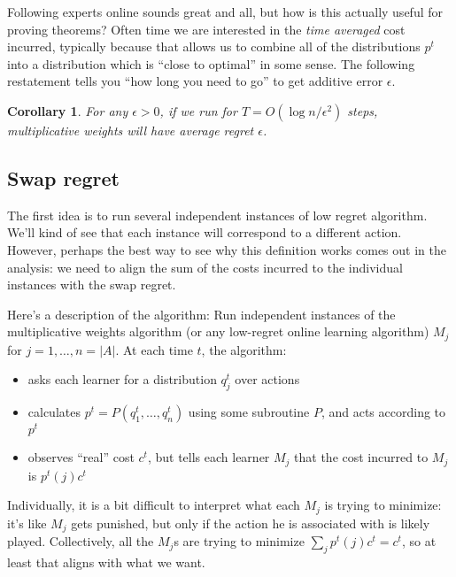 \documentclass[12pt]{article}
\newtheorem{corollary}[definition]{Corollary}
\begin{document}
Following experts online sounds great and all, but how is this actually useful
for proving theorems? Often time we are interested in the \emph{time averaged}
cost incurred, typically because that allows us to combine all of the
distributions $p^t$ into a distribution which is ``close to optimal'' in some
sense. The following restatement tells you ``how long you need to go'' to get
additive error $\epsilon$.

\begin{corollary}
  For any $\epsilon > 0$, if we run for $T = O(\log n / \epsilon^2)$ steps,
  multiplicative weights will have average regret $\epsilon$.
\end{corollary}








  \subsection{Swap regret}

  The first idea is to run several independent instances of low regret
  algorithm. We'll kind of see that each instance will correspond to a different
  action. However, perhaps the best way to see why this definition works comes
  out in the analysis: we need to align the sum of the costs incurred to the
  individual instances with the swap regret.

  Here's a description of the algorithm:
  Run independent instances of the multiplicative weights algorithm (or any
  low-regret online learning algorithm) $M_j$ for $j=1,\ldots,n = |A|$.
  At each time $t$, the algorithm:
  \begin{itemize}
    \item asks each learner for a distribution $q_j^t$ over actions
    \item calculates $p^t = P(q_1^t,\ldots,q_n^t)$ using some subroutine $P$,
      and acts according to $p^t$
    \item observes ``real'' cost $c^t$, but tells each learner $M_j$ that the
      cost incurred to $M_j$ is $p^t(j)c^t$
  \end{itemize}

  Individually, it is a bit difficult to interpret what each $M_j$ is trying to
  minimize: it's like $M_j$ gets punished, but only if the action he is
  associated with is likely played. Collectively, all the $M_j$s are trying to
  minimize $\sum_j p^t(j) c^t = c^t$, so at least that aligns with what we want.
\end{document}
